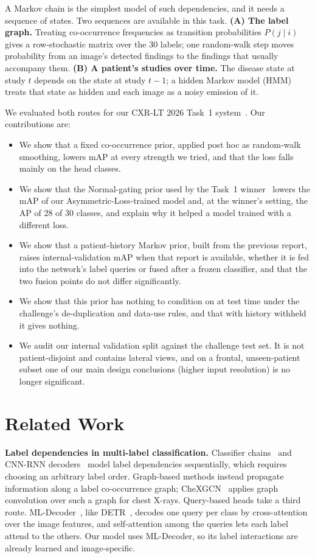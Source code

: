 \documentclass[conference]{IEEEtran}
\begin{document}
A Markov chain is the simplest model of such dependencies, and it needs a sequence of states. Two sequences are available in this task. \textbf{(A) The label graph.} Treating co-occurrence frequencies as transition probabilities $P(j \mid i)$ gives a row-stochastic matrix over the 30 labels; one random-walk step moves probability from an image's detected findings to the findings that usually accompany them. \textbf{(B) A patient's studies over time.} The disease state at study $t$ depends on the state at study $t{-}1$; a hidden Markov model (HMM) treats that state as hidden and each image as a noisy emission of it.

We evaluated both routes for our CXR-LT 2026 Task~1 system~\cite{b12,b14}. Our contributions are:
\begin{itemize}
\item We show that a fixed co-occurrence prior, applied post hoc as random-walk smoothing, lowers mAP at every strength we tried, and that the loss falls mainly on the head classes.
\item We show that the Normal-gating prior used by the Task~1 winner~\cite{b15} lowers the mAP of our Asymmetric-Loss-trained model and, at the winner's setting, the AP of 28 of 30 classes, and explain why it helped a model trained with a different loss.
\item We show that a patient-history Markov prior, built from the previous report, raises internal-validation mAP when that report is available, whether it is fed into the network's label queries or fused after a frozen classifier, and that the two fusion points do not differ significantly.
\item We show that this prior has nothing to condition on at test time under the challenge's de-duplication and data-use rules, and that with history withheld it gives nothing.
\item We audit our internal validation split against the challenge test set. It is not patient-disjoint and contains lateral views, and on a frontal, unseen-patient subset one of our main design conclusions (higher input resolution) is no longer significant.
\end{itemize}

\section{Related Work}
\textbf{Label dependencies in multi-label classification.} Classifier chains~\cite{b18} and CNN-RNN decoders~\cite{b19} model label dependencies sequentially, which requires choosing an arbitrary label order. Graph-based methods instead propagate information along a label co-occurrence graph; CheXGCN~\cite{b17} applies graph convolution over such a graph for chest X-rays. Query-based heads take a third route. ML-Decoder~\cite{b2}, like DETR~\cite{b13}, decodes one query per class by cross-attention over the image features, and self-attention among the queries lets each label attend to the others. Our model uses ML-Decoder, so its label interactions are already learned and image-specific.
\end{document}
